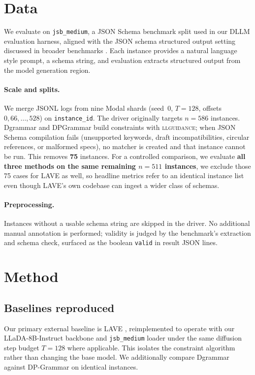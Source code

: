 \section{Data}
\label{sec:data}

We evaluate on \texttt{jsb\_medium}, a JSON Schema benchmark split used in our DLLM evaluation harness, aligned with the JSON schema structured output setting discussed in broader benchmarks \citep{geng2025jsonschemabenchrigorousbenchmarkstructured}. Each instance provides a natural language style prompt, a schema string, and evaluation extracts structured output from the model generation region.

\paragraph{Scale and splits.}
We merge JSONL logs from nine Modal shards (seed~$0$, $T{=}128$, offsets $0,66,\ldots,528$) on \texttt{instance\_id}. The driver originally targets $n{=}586$ instances. Dgrammar and DPGrammar build constraints with \textsc{llguidance}; when JSON Schema compilation fails (unsupported keywords, draft incompatibilities, circular references, or malformed specs), no matcher is created and that instance cannot be run. This removes \textbf{75} instances. For a controlled comparison, we evaluate \textbf{all three methods on the same remaining $n{=}511$ instances}, we exclude those 75 cases for LAVE as well, so headline metrics refer to an identical instance list even though LAVE's own codebase can ingest a wider class of schemas.


\paragraph{Preprocessing.}
Instances without a usable schema string are skipped in the driver. No additional manual annotation is performed; validity is judged by the benchmark's extraction and schema check, surfaced as the boolean \texttt{valid} in result JSON lines.

\section{Method}
\label{sec:method}

\subsection{Baselines reproduced}
Our primary external baseline is LAVE \citep{zhang2026lookaheadthenverifyreliableconstraineddecoding}, reimplemented to operate with our LLaDA-8B-Instruct backbone and \texttt{jsb\_medium} loader under the same diffusion step budget $T{=}128$ where applicable. This isolates the constraint algorithm rather than changing the base model. We additionally compare Dgrammar against DP-Grammar on identical instances.

